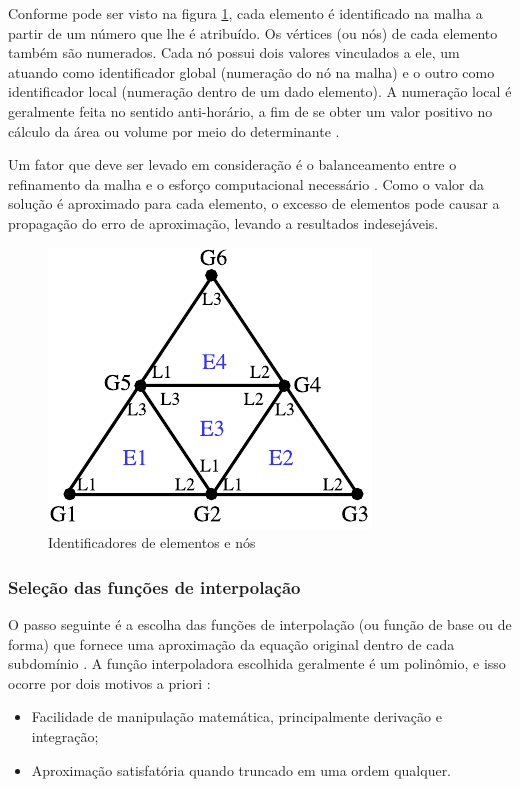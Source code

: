 \documentclass[
    12pt,               %
    openright,          %
    oneside,
    a4paper,            %
    english,            %
    french,             %
    spanish,            %
    brazil              %
    ]{abntex2}
\begin{document}
Conforme pode ser visto na figura \ref{fig:numeracao}, cada elemento é identificado na malha a partir de um número que lhe é atribuído. Os vértices (ou nós) de cada elemento também são numerados. Cada nó possui dois valores vinculados a ele, um atuando como identificador global (numeração do nó na malha) e o outro como identificador local (numeração dentro de um dado elemento). A numeração local é geralmente feita no sentido anti-horário, a fim de se obter um valor positivo no cálculo da área ou volume por meio do  determinante \cite{sadiku, jin}. 

Um fator que deve ser levado em consideração é o balanceamento entre o refinamento da malha e o esforço computacional necessário \cite{desai}. Como o valor da solução é aproximado para cada elemento, o excesso de elementos pode causar a propagação do erro de aproximação, levando a resultados indesejáveis.


\begin{figure}[!htb]
	\centering
	\includegraphics[scale=1.2]{figuras/id.pdf}
	\caption{Identificadores de elementos e nós}
	\label{fig:numeracao}
\end{figure}

\subsubsection*{Seleção das funções de interpolação}
\label{sec:interp}
O passo seguinte é a escolha das funções de interpolação (ou função de base ou de forma) \cite{huebner} que fornece uma aproximação da equação original dentro de cada subdomínio \cite{jin}. 
A função interpoladora escolhida geralmente é um polinômio, e isso ocorre por dois motivos a priori \cite{desai}:

\begin{itemize}  
	\item Facilidade de manipulação matemática, principalmente derivação e integração;
	\item Aproximação satisfatória quando truncado em uma ordem qualquer.
\end{itemize}
\end{document}
